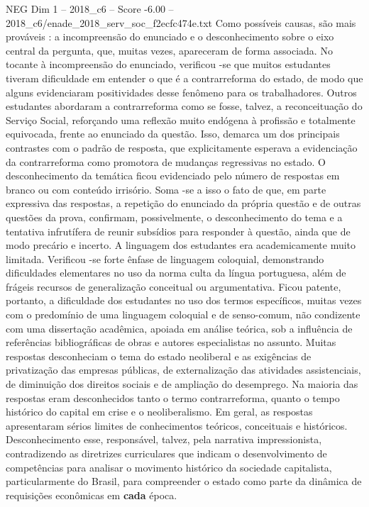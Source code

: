 \begin{textsample}{NEG Dim 1 – 2018\_c6 – Score -6.00 – 2018\_c6/enade\_2018\_serv\_soc\_f2ecfc474e.txt}
Como possíveis causas, são mais prováveis : a incompreensão do enunciado e o desconhecimento sobre o eixo central da pergunta, que, muitas vezes, apareceram de forma associada.
No tocante à incompreensão do enunciado, verificou -se que muitos estudantes tiveram dificuldade em entender o que é a contrarreforma do estado, de modo que alguns evidenciaram positividades desse fenômeno para os trabalhadores.
Outros estudantes abordaram a contrarreforma como se fosse, talvez, a reconceituação do Serviço Social, reforçando uma reflexão muito endógena à profissão e totalmente equivocada, frente ao enunciado da questão.
Isso, demarca um dos principais contrastes com o padrão de resposta, que explicitamente esperava a evidenciação da contrarreforma como promotora de mudanças regressivas no estado.
O desconhecimento da temática ficou evidenciado pelo número de respostas em branco ou com conteúdo irrisório.
Soma -se a isso o fato de que, em parte expressiva das respostas, a repetição do enunciado da própria questão e de outras questões da prova, confirmam, possivelmente, o desconhecimento do tema e a tentativa infrutífera de reunir subsídios para responder à questão, ainda que de modo precário e incerto.
A linguagem dos estudantes era academicamente muito limitada.
Verificou -se forte ênfase de linguagem coloquial, demonstrando dificuldades elementares no uso da norma culta da língua portuguesa, além de frágeis recursos de generalização conceitual ou argumentativa.
Ficou patente, portanto, a dificuldade dos estudantes no uso dos termos específicos, muitas vezes com o predomínio de uma linguagem coloquial e de senso-comum, não condizente com uma dissertação acadêmica, apoiada em análise teórica, sob a influência de referências bibliográficas de obras e autores especialistas no assunto.
Muitas respostas desconheciam o tema do estado neoliberal e as exigências de privatização das empresas públicas, de externalização das atividades assistenciais, de diminuição dos direitos sociais e de ampliação do desemprego.
Na maioria das respostas eram desconhecidos tanto o termo contrarreforma, quanto o tempo histórico do capital em crise e o neoliberalismo.
Em geral, as respostas apresentaram sérios limites de conhecimentos teóricos, conceituais e históricos.
Desconhecimento esse, responsável, talvez, pela narrativa impressionista, contradizendo as diretrizes curriculares que indicam o desenvolvimento de competências para analisar o movimento histórico da sociedade capitalista, particularmente do Brasil, para compreender o estado como parte da dinâmica de requisições econômicas em \textbf{cada} época.

\end{textsample}

